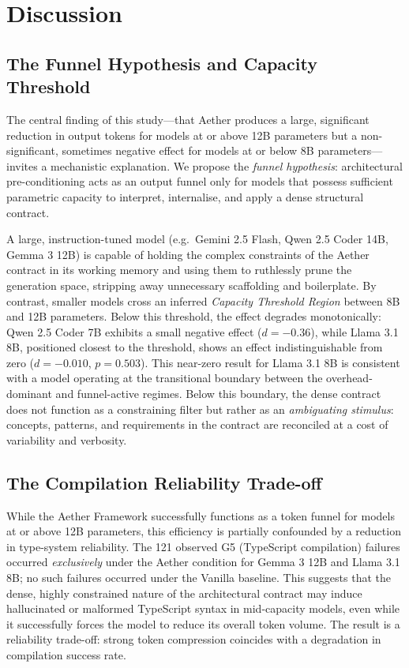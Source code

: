 \documentclass[review,12pt,3p]{elsarticle}
\begin{document}
\section{Discussion}
\label{sec:discussion}

\subsection{The Funnel Hypothesis and Capacity Threshold}

The central finding of this study---that Aether produces a large, significant reduction
in output tokens for models at or above 12B parameters but a non-significant, sometimes negative
effect for models at or below 8B parameters---invites a mechanistic explanation. We propose the
\emph{funnel hypothesis}: architectural pre-conditioning acts as an output funnel only for models
that possess sufficient parametric capacity to interpret, internalise, and apply a dense structural
contract. 

A large, instruction-tuned model (e.g.\ Gemini 2.5 Flash, Qwen 2.5 Coder 14B, Gemma 3 12B) is capable
of holding the complex constraints of the Aether contract in its working memory and using them to
ruthlessly prune the generation space, stripping away unnecessary scaffolding and boilerplate. By contrast,
smaller models cross an inferred \emph{Capacity Threshold Region} between 8B and 12B parameters.
Below this threshold, the effect degrades monotonically: Qwen 2.5 Coder 7B exhibits a small
negative effect ($d = -0.36$), while Llama 3.1 8B, positioned closest to the threshold, shows
an effect indistinguishable from zero ($d = -0.010$, $p = 0.503$). This near-zero result for
Llama 3.1 8B is consistent with a model operating at the transitional boundary between the
overhead-dominant and funnel-active regimes. Below this boundary, the dense contract does not
function as a constraining filter but rather as an \emph{ambiguating stimulus}: concepts, patterns,
and requirements in the contract are reconciled at a cost of variability and verbosity.


\subsection{The Compilation Reliability Trade-off}

While the Aether Framework successfully functions as a token funnel for models at or above 12B parameters, this efficiency is partially confounded by a reduction in type-system reliability. The 121 observed G5 (TypeScript compilation) failures occurred \emph{exclusively} under the Aether condition for Gemma 3 12B and Llama 3.1 8B; no such failures occurred under the Vanilla baseline. This suggests that the dense, highly constrained nature of the architectural contract may induce hallucinated or malformed TypeScript syntax in mid-capacity models, even while it successfully forces the model to reduce its overall token volume. The result is a reliability trade-off: strong token compression coincides with a degradation in compilation success rate.
\end{document}
